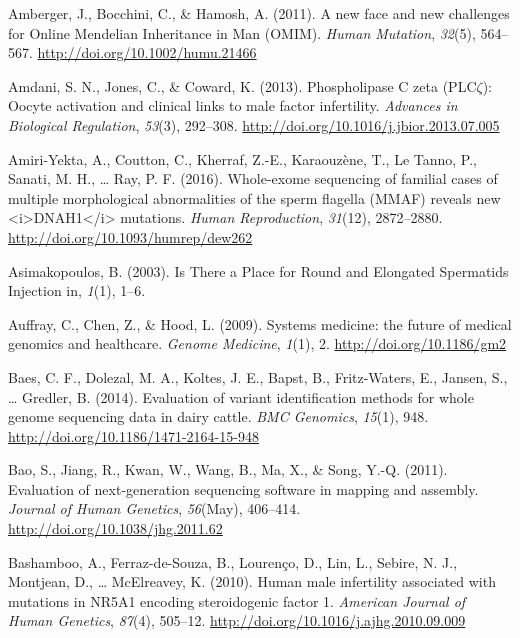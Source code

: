 \documentclass[12pt,twoside]{reedthesis}
\theoremstyle{definition}
\theoremstyle{definition}
\theoremstyle{remark}
\begin{document}
  \hypertarget{ref-Amberger2011}{}
  Amberger, J., Bocchini, C., \& Hamosh, A. (2011). A new face and new
  challenges for Online Mendelian Inheritance in Man (OMIM). \emph{Human
  Mutation}, \emph{32}(5), 564--567.
  \url{http://doi.org/10.1002/humu.21466}
  
  \hypertarget{ref-Amdani2013}{}
  Amdani, S. N., Jones, C., \& Coward, K. (2013). Phospholipase C zeta
  (PLC\(\zeta\)): Oocyte activation and clinical links to male factor
  infertility. \emph{Advances in Biological Regulation}, \emph{53}(3),
  292--308. \url{http://doi.org/10.1016/j.jbior.2013.07.005}
  
  \hypertarget{ref-Amiri-Yekta2016}{}
  Amiri-Yekta, A., Coutton, C., Kherraf, Z.-E., Karaouzène, T., Le Tanno,
  P., Sanati, M. H., \ldots{} Ray, P. F. (2016). Whole-exome sequencing of
  familial cases of multiple morphological abnormalities of the sperm
  flagella (MMAF) reveals new
  \textless{}i\textgreater{}DNAH1\textless{}/i\textgreater{} mutations.
  \emph{Human Reproduction}, \emph{31}(12), 2872--2880.
  \url{http://doi.org/10.1093/humrep/dew262}
  
  \hypertarget{ref-Asimakopoulos2003}{}
  Asimakopoulos, B. (2003). Is There a Place for Round and Elongated
  Spermatids Injection in, \emph{1}(1), 1--6.
  
  \hypertarget{ref-Auffray2009}{}
  Auffray, C., Chen, Z., \& Hood, L. (2009). Systems medicine: the future
  of medical genomics and healthcare. \emph{Genome Medicine}, \emph{1}(1),
  2. \url{http://doi.org/10.1186/gm2}
  
  \hypertarget{ref-Baes2014}{}
  Baes, C. F., Dolezal, M. A., Koltes, J. E., Bapst, B., Fritz-Waters, E.,
  Jansen, S., \ldots{} Gredler, B. (2014). Evaluation of variant
  identification methods for whole genome sequencing data in dairy cattle.
  \emph{BMC Genomics}, \emph{15}(1), 948.
  \url{http://doi.org/10.1186/1471-2164-15-948}
  
  \hypertarget{ref-Bao2011}{}
  Bao, S., Jiang, R., Kwan, W., Wang, B., Ma, X., \& Song, Y.-Q. (2011).
  Evaluation of next-generation sequencing software in mapping and
  assembly. \emph{Journal of Human Genetics}, \emph{56}(May), 406--414.
  \url{http://doi.org/10.1038/jhg.2011.62}
  
  \hypertarget{ref-Bashamboo2010}{}
  Bashamboo, A., Ferraz-de-Souza, B., Lourenço, D., Lin, L., Sebire, N.
  J., Montjean, D., \ldots{} McElreavey, K. (2010). Human male infertility
  associated with mutations in NR5A1 encoding steroidogenic factor 1.
  \emph{American Journal of Human Genetics}, \emph{87}(4), 505--12.
  \url{http://doi.org/10.1016/j.ajhg.2010.09.009}
  
\end{document}
